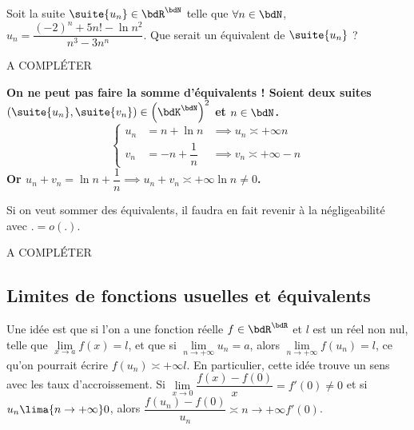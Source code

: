 \documentclass[a4paper,french,bookmarks]{article}
\begin{document}
\begin{example}{}{}
    Soit la suite $\suite{u_n} \in \bdR^\bdN$ telle que $\forall n \in \bdN$, $u_n = \dfrac{(-2)^n + 5n! - \ln{n^2}}{n^3 - 3n^n}$. Que serait un équivalent de $\suite{u_n}$ ?
    \tcblower
    
    A COMPLÉTER
    
\end{example}

\begin{warning}{}{}
    \bf{On ne peut pas faire la somme d'équivalents !} Soient deux suites $(\suite{u_n}, \suite{v_n}) \in \left(\bdK^\bdN\right)^2$ et $n \in \bdN$.
    \[ \left\lbrace\begin{array}{lll}
        u_n &= n + \ln{n} &\implies u_n \asymp{+\infty} n \\
        v_n &= - n + \dfrac{1}{n} &\implies v_n \asymp{+\infty} -n
    \end{array}\right.\]
    Or $u_n + v_n = \ln{n} + \dfrac{1}{n} \implies u_n + v_n \asymp{+\infty} \ln{n} \neq 0$. 
\end{warning}

Si on veut sommer des équivalents, il faudra en fait revenir à la négligeabilité avec $. = o(.)$.

A COMPLÉTER

\subsection{Limites de fonctions usuelles et équivalents}

Une idée est que si l'on a une fonction réelle $f \in \bdR^\bdR$ et $l$ est un réel non nul, telle que $\lim\limits_{x \to a} f(x) = l$, et que si $\lim\limits_{n \to + \infty} u_n = a$, alors $\lim\limits_{n \to +\infty} f(u_n) = l$, ce qu'on pourrait écrire $f(u_n) \asymp{+\infty} l$. En particulier, cette idée trouve un sens avec les taux d'accroissement. Si $\lim\limits_{x \to 0} \dfrac{f(x) - f(0)}{x} = f'(0) \neq 0$ et si $u_n \lima{n \to +\infty} 0$, alors $\dfrac{f(u_n) - f(0)}{u_n} \asymp{n \to +\infty} f'(0)$.
\end{document}
